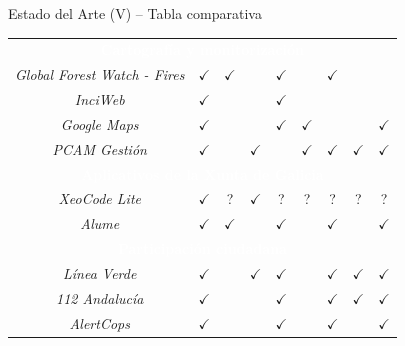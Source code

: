 \begin{frame}[c,shrink]{Estado del Arte (V) -- Tabla comparativa}
\begin{center}
{\begin{tabular}{c|c|c|c|c|c|c|c|c}
\multicolumn{9}{c}{\cellcolor{dkgreen!60}\textcolor{white}{\textbf{Cartografía y monitorización}}} \\[2pt]

\rowcolor{dkgreen!20}
\textit{Global Forest Watch - Fires} & $\checkmark$ & $\checkmark$ &  & $\checkmark$ &  & $\checkmark$ &  &  \\
\rowcolor{dkgreen!20}
\textit{InciWeb} & $\checkmark$ &  &  & $\checkmark$ &  &  &  &  \\
\rowcolor{dkgreen!20}
\textit{Google Maps} & $\checkmark$ &  &  & $\checkmark$ & $\checkmark$ &  &  & $\checkmark$ \\
\rowcolor{dkgreen!20}
\textit{PCAM Gestión} & $\checkmark$ &  & $\checkmark$ &  & $\checkmark$ & $\checkmark$ & $\checkmark$ & $\checkmark$ \\[4pt]

\multicolumn{9}{c}{\cellcolor{xuntaorange!60}\textcolor{white}{\textbf{Aplicativos de la Xunta de Galicia}}} \\[2pt]

\rowcolor{xuntaorange!20}
\textit{XeoCode Lite} & $\checkmark$ & ? & $\checkmark$ & ? & ? & ? & ? & ? \\
\rowcolor{xuntaorange!20}
\textit{Alume} & $\checkmark$ & $\checkmark$ &  & $\checkmark$ &  & $\checkmark$ &  & $\checkmark$ \\[4pt]

\multicolumn{9}{c}{\cellcolor{mauve!60}\textcolor{white}{\textbf{Participación ciudadana}}} \\[2pt]

\rowcolor{mauve!20}
\textit{Línea Verde} & $\checkmark$ &  & $\checkmark$ & $\checkmark$ & & $\checkmark$ & $\checkmark$ & $\checkmark$ \\
\rowcolor{mauve!20}
\textit{112 Andalucía} & $\checkmark$ &  &  & $\checkmark$ &  & $\checkmark$ & $\checkmark$ & $\checkmark$ \\
\rowcolor{mauve!20}
\textit{AlertCops} & $\checkmark$ &  &  & $\checkmark$ &  & $\checkmark$ &  & $\checkmark$ \\
\end{tabular}}
\end{center}

\end{frame}
